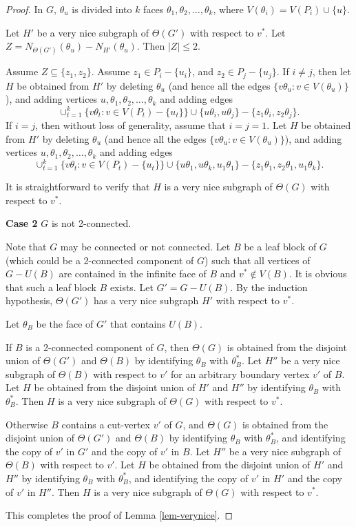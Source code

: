 \documentclass[10pt,a4paper]{amsart}
\begin{document}
\begin{proof}
    
    In $G$, $\theta_u$ is divided into $k$ faces $\theta_1, \theta_2, \ldots, \theta_k$, where $V(\theta_i) = V(P_i) \cup \{u\}$. 
    
    Let $H'$ be a very nice subgraph of $\Theta(G')$ with respect to $v^*$. Let $Z=N_{\Theta(G')}(\theta_u) -N_{H'}(\theta_u)$. Then $|Z| \le 2$. 
    
    Assume $Z \subseteq \{z_1,z_2\}$. Assume   $z_1 \in P_i - \{u_i\}$, and $z_2 \in P_j-\{u_j\}$. 
    If $i \ne j$, then let $H$ be obtained from $H'$ by deleting  $\theta_u$ (and hence all the  edges $\{v\theta_u: v \in V(\theta_u)\}$), and adding vertices $u, \theta_1,\theta_2,
    \ldots, \theta_k$ and adding  edges 
    $$\cup_{t=1}^k\{v\theta_t: v \in V(P_t)-\{u_t\}\} \cup \{u\theta_i,u\theta_j\} - \{z_1\theta_i,z_2\theta_j\}.$$ 
    If $i=j$, then without loss of generality, assume that 
$i=j=1$. Let 
$H$ be obtained from $H'$ by deleting  $\theta_u$ (and hence all the  edges $\{v\theta_u: v \in V(\theta_u)\}$), and adding vertices $u, \theta_1,\theta_2,
    \ldots, \theta_k$ and adding  edges   
    $$\cup_{t=1}^k\{v\theta_t: v \in V(P_t)-\{u_t\}\} \cup \{u\theta_1, u\theta_k, u_1\theta_1\} - \{z_1\theta_1,z_2\theta_1, u_1\theta_k\}.$$

    It is straightforward to verify that $H$ is a very nice subgraph of $\Theta(G)$ with respect to $v^*$.  


\medskip
\noindent
{\bf Case 2} 
 $G$ is not 2-connected.
 \medskip

Note that $G$ may be connected or not connected. Let $B$ be a leaf block of $G$ (which could be a 2-connected component of $G$) such that
all vertices of $G-U(B)$ are contained in the infinite face of $B$ and $v^* \notin V(B)$. It is obvious that such a leaf block $B$ exists. Let $G'=G-U(B)$. By the induction hypothesis, $\Theta(G')$ has a very nice subgraph $H'$ with respect to $v^*$.  

Let $\theta_B$ be the face of $G'$ that contains $U(B)$. 

If $B$ is a 2-connected component of $G$, then $\Theta(G)$ is obtained from the disjoint union of $\Theta(G')$ and $\Theta(B)$ by identifying $\theta_B$ with $\theta^*_B$. Let $H''$ be a very nice subgraph of $\Theta(B)$ with respect to $v'$ for an arbitrary boundary vertex $v'$ of $B$. Let $H$ be obtained from the disjoint union of $H'$ and $H''$ by identifying $\theta_B$ with $\theta^*_B$. Then $H$ is a very nice subgraph of $\Theta(G)$ with respect to $v^*$. 

Otherwise $B$ contains a cut-vertex $v'$ of $G$, and $\Theta(G)$ is obtained from the disjoint union of $\Theta(G')$ and $\Theta(B)$ by identifying $\theta_B$ with $\theta^*_B$, and identifying the copy of $v'$ in $G'$ and the copy of $v'$ in $B$. Let $H''$ be a very nice subgraph of $\Theta(B)$ with respect to $v'$. Let $H$ be obtained from the disjoint union of $H'$ and $H''$ by identifying $\theta_B$ with $\theta^*_B$, and identifying the copy of $v'$ in $H'$ and the copy of $v'$ in $H''$.   Then $H$ is a very nice subgraph of $\Theta(G)$ with respect to $v^*$. 

This completes the proof of Lemma \ref{lem-verynice}.
\end{proof}
\end{document}
